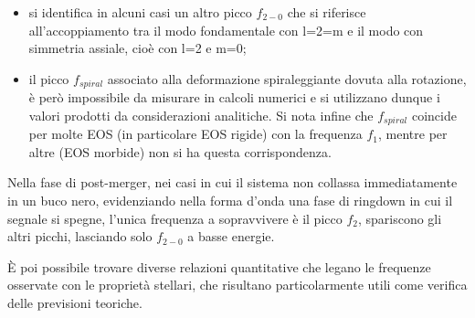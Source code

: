 \begin{itemize}
	\item si identifica in alcuni casi un altro picco $f_{2-0}$ che si riferisce all'accoppiamento tra il modo fondamentale con l=2=m e il modo con simmetria assiale, cioè con l=2 e m=0;
	\item il picco $f_{spiral}$ associato alla deformazione spiraleggiante dovuta alla rotazione, è però impossibile da misurare in calcoli numerici e si utilizzano dunque i valori prodotti da considerazioni analitiche. Si nota infine che $f_{spiral}$ coincide per molte EOS (in particolare EOS rigide) con la frequenza $f_1$, mentre per altre (EOS morbide) non si ha questa corrispondenza.
\end{itemize}

Nella fase di post-merger, nei casi in cui il sistema non collassa immediatamente in un buco nero, evidenziando nella forma d'onda una fase di ringdown in cui il segnale si spegne, l'unica frequenza a sopravvivere è il picco $f_2$, spariscono gli altri picchi, lasciando solo $f_{2-0}$ a basse energie.

È poi possibile trovare diverse relazioni quantitative che legano le frequenze osservate con le proprietà stellari, che risultano particolarmente utili come verifica delle previsioni teoriche.
